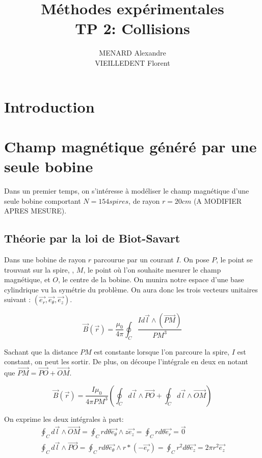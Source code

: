 \documentclass[12pt]{article}
\title{\textbf{Méthodes expérimentales} \\ TP 2: Collisions}
\author{MENARD Alexandre \\ VIEILLEDENT Florent}
\begin{document}
\maketitle

\section*{Introduction}

\newpage
\section{Champ magnétique généré par une seule bobine}
Dans un premier temps, on s'intéresse à modéliser le champ magnétique d'une seule bobine comportant 
$N = 154 spires$, de rayon $r = 20cm$ (A MODIFIER APRES MESURE).

\subsection{Théorie par la loi de Biot-Savart}
Dans une bobine de rayon $r$ parcourue par un courant $I$. On pose $P$, le point se trouvant sur la spire,
, $M$, le point où l'on souhaite mesurer le champ magnétique, et $O$, le centre de la bobine. On munira notre espace d'une base cylindrique vu
la symétrie du problème. On aura donc les trois vecteurs unitaires suivant : $(\vec{e_r}, \vec{e_\theta}, \vec{e_z})$.

\begin{equation}
    \vec{B}(\vec{r}) = \frac{\mu_0}{4 \pi} \oint_C \frac{I d\vec{l} \wedge (\vec{PM})}{PM^3}
\end{equation}

Sachant que la distance $PM$ est constante lorsque l'on parcoure la spire, $I$ est constant, on peut les sortir. De plus,
on découpe l'intégrale en deux en notant que $\vec{PM} = \vec{PO} + \vec{OM}$.

\begin{equation}
    \vec{B}(\vec{r}) = \frac{I \mu_0}{4 \pi PM^3} \left( \oint_C d\vec{l} \wedge \vec{PO} + \oint_C d\vec{l} \wedge \vec{OM} \right)
\end{equation}

On exprime les deux intégrales à part:
\begin{gather*}
    \oint_C d\vec{l} \wedge \vec{OM} = \oint_C rd\theta \vec{e_\theta} \wedge z\vec{e_z} = \oint_C rd\theta \vec{e_r} = \vec{0} \\
    \oint_C d\vec{l} \wedge \vec{PO} = \oint_C rd\theta \vec{e_\theta} \wedge r * (-\vec{e_r}) = \oint_C r^2 d\theta \vec{e_z} = 2 \pi r^2\vec{e_z}
\end{gather*}
\end{document}
